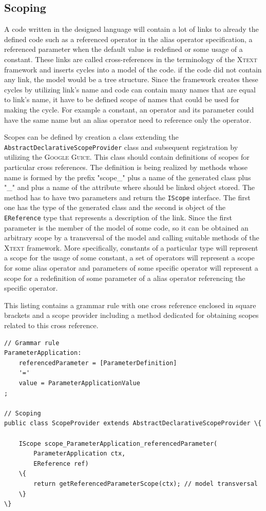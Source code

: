 \documentclass[12pt,notitlepage,a4paper]{report}
\begin{document}
\subsection{Scoping} 
\label{ScopingOperators}
A code written in the designed language will contain a lot of links to already the defined code such as a referenced operator in the alias operator specification, a referenced parameter when the default value is redefined or some usage of a constant. These links are called cross-references in the terminology of the \textsc{Xtext} framework and inserts cycles into a model of the code. if the code did not contain any link, the model would be a tree structure.  Since the framework creates these cycles by utilizing link's name and  code can contain many names that are equal to link's name, it have to be defined scope of names that could be used for making the cycle. For example a constant, an operator and its parameter could have the same name but an alias operator need to reference only the operator. 

Scopes can be defined by creation a class extending the \texttt{AbstractDeclarativeScopeProvider} class and subsequent registration by utilizing the \textsc{Google Guice}. This class should contain definitions of scopes for particular cross references. The definition is being realized by methods whose name is formed by the prefix "scope\_" plus a name of the generated class plus "\_" and plus a name of the attribute where should be linked object stored. The method has to have two parameters and return the \texttt{IScope} interface. The first one has the type of the generated class and the second is object of the \texttt{EReference} type that represents a description of the link. Since the first parameter is the member of the model of some code, so it can be obtained an arbitrary scope by a transversal of the model and calling suitable methods of the \textsc{Xtext} framework. More specifically, constants of a particular type will represent a scope for the usage of some constant, a set of operators will represent a scope for some alias operator and parameters of some specific operator will represent a scope for a redefinition of some parameter of a alias operator referencing the specific operator. 

\begin{expl}\label{ScopingE}
This listing contains a grammar rule with one cross reference enclosed in square brackets and a scope provider including a method dedicated for obtaining scopes related to this cross reference.
\begingroup
\fontsize{10pt}{12pt}
\begin{Verbatim}[commandchars=\\\{\}]
// Grammar rule
ParameterApplication:
    referencedParameter = [ParameterDefinition]
    '='
    value = ParameterApplicationValue
;

// Scoping
public class ScopeProvider extends AbstractDeclarativeScopeProvider \{

    IScope scope_ParameterApplication_referencedParameter(
        ParameterApplication ctx,
        EReference ref)
    \{
        return getReferencedParameterScope(ctx); // model transversal
    \}
\}
\end{Verbatim}
\endgroup
\end{expl}
\end{document}
